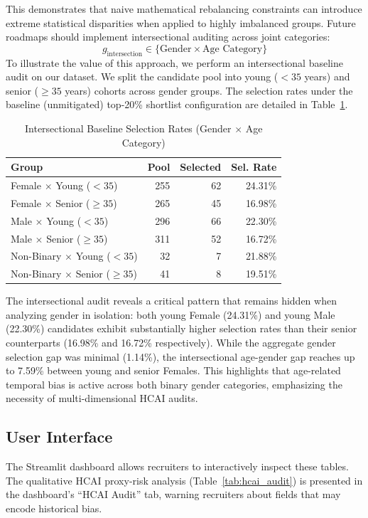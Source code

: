 \documentclass[sigconf]{acmart}
\begin{document}
This demonstrates that naive mathematical rebalancing constraints can introduce extreme statistical disparities when applied to highly imbalanced groups. Future roadmaps should implement intersectional auditing across joint categories:
\begin{equation}
g_{\text{intersection}} \in \{ \text{Gender} \times \text{Age Category} \}
\end{equation}
To illustrate the value of this approach, we perform an intersectional baseline audit on our dataset. We split the candidate pool into young ($<35$ years) and senior ($\ge 35$ years) cohorts across gender groups. The selection rates under the baseline (unmitigated) top-20\% shortlist configuration are detailed in Table~\ref{tab:intersectional_audit}.

\begin{table}[h]
\centering
\small
\setlength{\tabcolsep}{4pt}
\caption{Intersectional Baseline Selection Rates (Gender $\times$ Age Category)}
\label{tab:intersectional_audit}
\begin{tabular}{lrrr}
\toprule
\textbf{Group} & \textbf{Pool} & \textbf{Selected} & \textbf{Sel. Rate} \\
\midrule
Female $\times$ Young ($<35$) & 255 & 62 & 24.31\% \\
Female $\times$ Senior ($\ge 35$) & 265 & 45 & 16.98\% \\
Male $\times$ Young ($<35$) & 296 & 66 & 22.30\% \\
Male $\times$ Senior ($\ge 35$) & 311 & 52 & 16.72\% \\
Non-Binary $\times$ Young ($<35$) & 32 & 7 & 21.88\% \\
Non-Binary $\times$ Senior ($\ge 35$) & 41 & 8 & 19.51\% \\
\bottomrule
\end{tabular}
\end{table}

The intersectional audit reveals a critical pattern that remains hidden when analyzing gender in isolation: both young Female (24.31\%) and young Male (22.30\%) candidates exhibit substantially higher selection rates than their senior counterparts (16.98\% and 16.72\% respectively). While the aggregate gender selection gap was minimal (1.14\%), the intersectional age-gender gap reaches up to 7.59\% between young and senior Females. This highlights that age-related temporal bias is active across both binary gender categories, emphasizing the necessity of multi-dimensional HCAI audits.

\subsection{User Interface}
The Streamlit dashboard allows recruiters to interactively inspect these tables. The qualitative HCAI proxy-risk analysis (Table~\ref{tab:hcai_audit}) is presented in the dashboard's ``HCAI Audit'' tab, warning recruiters about fields that may encode historical bias.
\end{document}

